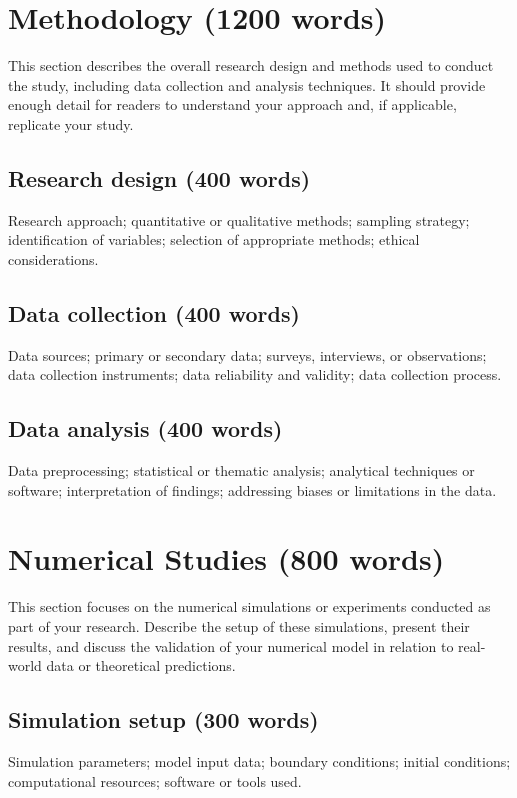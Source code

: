 \documentclass[journal,article,submit,pdftex,moreauthors]{Definitions/mdpi}
\begin{document}
%
%

\section{Methodology (1200 words)}\label{sec:4} 
This section describes the overall research design and methods used to conduct the study, including data collection and analysis techniques. It should provide enough detail for readers to understand your approach and, if applicable, replicate your study.

\subsection{Research design (400 words)} Research approach; quantitative or qualitative methods; sampling strategy; identification of variables; selection of appropriate methods; ethical considerations.

\subsection{Data collection (400 words)} Data sources; primary or secondary data; surveys, interviews, or observations; data collection instruments; data reliability and validity; data collection process.

\subsection{Data analysis (400 words)} Data preprocessing; statistical or thematic analysis; analytical techniques or software; interpretation of findings; addressing biases or limitations in the data.

%
%

\section{Numerical Studies (800 words)} \label{sec:5}
This section focuses on the numerical simulations or experiments conducted as part of your research. Describe the setup of these simulations, present their results, and discuss the validation of your numerical model in relation to real-world data or theoretical predictions.

\subsection{Simulation setup (300 words)} Simulation parameters; model input data; boundary conditions; initial conditions; computational resources; software or tools used.
\end{document}
